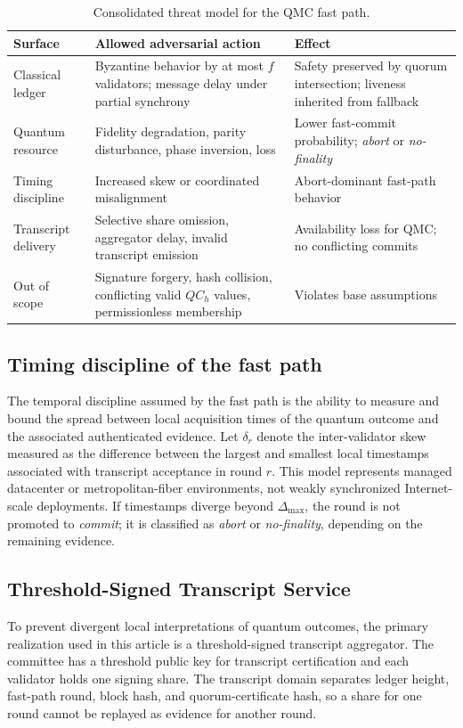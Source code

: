 \documentclass{ieeeaccess}
\begin{document}
\begin{table}[H]
\caption{Consolidated threat model for the QMC fast path.}
\label{tab:threat}
\centering
\scriptsize
\setlength{\tabcolsep}{3.4pt}
\renewcommand{\arraystretch}{1.12}
\begin{tabularx}{\columnwidth}{p{1.75cm}Yp{1.15cm}}
\toprule
\textbf{Surface} & \textbf{Allowed adversarial action} & \textbf{Effect} \\
\midrule
Classical ledger & Byzantine behavior by at most $f$ validators; message delay under partial synchrony & Safety preserved by quorum intersection; liveness inherited from fallback \\
Quantum resource & Fidelity degradation, parity disturbance, phase inversion, loss & Lower fast-commit probability; \textit{abort} or \textit{no-finality} \\
Timing discipline & Increased skew or coordinated misalignment & Abort-dominant fast-path behavior \\
Transcript delivery & Selective share omission, aggregator delay, invalid transcript emission & Availability loss for QMC; no conflicting commits \\
Out of scope & Signature forgery, hash collision, conflicting valid $QC_h$ values, permissionless membership & Violates base assumptions \\
\bottomrule
\end{tabularx}
\end{table}

\subsection{Timing discipline of the fast path}
The temporal discipline assumed by the fast path is the ability to measure and bound the spread between local acquisition times of the quantum outcome and the associated authenticated evidence. Let $\delta_r$ denote the inter-validator skew measured as the difference between the largest and smallest local timestamps associated with transcript acceptance in round $r$. This model represents managed datacenter or metropolitan-fiber environments, not weakly synchronized Internet-scale deployments. If timestamps diverge beyond $\Delta_{\max}$, the round is not promoted to \textit{commit}; it is classified as \textit{abort} or \textit{no-finality}, depending on the remaining evidence.

\subsection{Threshold-Signed Transcript Service}
To prevent divergent local interpretations of quantum outcomes, the primary realization used in this article is a threshold-signed transcript aggregator. The committee has a threshold public key for transcript certification and each validator holds one signing share. The transcript domain separates ledger height, fast-path round, block hash, and quorum-certificate hash, so a share for one round cannot be replayed as evidence for another round.
\end{document}
